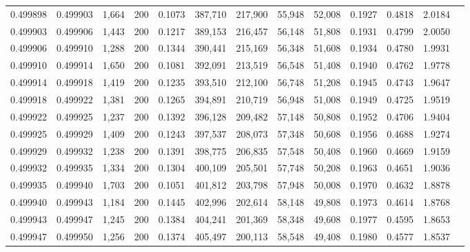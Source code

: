 \begin{tabular}{rrrrrrrrrrrrr}
0.499898 & 0.499903 & 1,664 & 200 &                                     0.1073 & 387,710 & 217,900 &  55,948 &  52,008 & 0.1927 & 0.4818 & 2.0184 \\
0.499903 & 0.499906 & 1,443 & 200 &                                     0.1217 & 389,153 & 216,457 &  56,148 &  51,808 & 0.1931 & 0.4799 & 2.0050 \\
0.499906 & 0.499910 & 1,288 & 200 &                                     0.1344 & 390,441 & 215,169 &  56,348 &  51,608 & 0.1934 & 0.4780 & 1.9931 \\
0.499910 & 0.499914 & 1,650 & 200 &                                     0.1081 & 392,091 & 213,519 &  56,548 &  51,408 & 0.1940 & 0.4762 & 1.9778 \\
0.499914 & 0.499918 & 1,419 & 200 &                                     0.1235 & 393,510 & 212,100 &  56,748 &  51,208 & 0.1945 & 0.4743 & 1.9647 \\
0.499918 & 0.499922 & 1,381 & 200 &                                     0.1265 & 394,891 & 210,719 &  56,948 &  51,008 & 0.1949 & 0.4725 & 1.9519 \\
0.499922 & 0.499925 & 1,237 & 200 &                                     0.1392 & 396,128 & 209,482 &  57,148 &  50,808 & 0.1952 & 0.4706 & 1.9404 \\
0.499925 & 0.499929 & 1,409 & 200 &                                     0.1243 & 397,537 & 208,073 &  57,348 &  50,608 & 0.1956 & 0.4688 & 1.9274 \\
0.499929 & 0.499932 & 1,238 & 200 &                                     0.1391 & 398,775 & 206,835 &  57,548 &  50,408 & 0.1960 & 0.4669 & 1.9159 \\
0.499932 & 0.499935 & 1,334 & 200 &                                     0.1304 & 400,109 & 205,501 &  57,748 &  50,208 & 0.1963 & 0.4651 & 1.9036 \\
0.499935 & 0.499940 & 1,703 & 200 &                                     0.1051 & 401,812 & 203,798 &  57,948 &  50,008 & 0.1970 & 0.4632 & 1.8878 \\
0.499940 & 0.499943 & 1,184 & 200 &                                     0.1445 & 402,996 & 202,614 &  58,148 &  49,808 & 0.1973 & 0.4614 & 1.8768 \\
0.499943 & 0.499947 & 1,245 & 200 &                                     0.1384 & 404,241 & 201,369 &  58,348 &  49,608 & 0.1977 & 0.4595 & 1.8653 \\
0.499947 & 0.499950 & 1,256 & 200 &                                     0.1374 & 405,497 & 200,113 &  58,548 &  49,408 & 0.1980 & 0.4577 & 1.8537 \\

\end{tabular}
